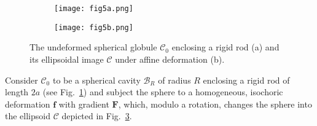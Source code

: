 \documentclass{article}
\begin{document}
\begin{figure}[h]
\centering
\begin{subfigure}[c]{0.3\linewidth}
		\centering
		\texttt{[image: fig5a.png]}
		\caption{}
		\label{fig:sphere}
	\end{subfigure}
\quad\quad 
\begin{subfigure}[c]{0.3\linewidth}
		\centering
		\texttt{[image: fig5b.png]}
		\caption{}
		\label{fig:ellipsoid}
	\end{subfigure}
\caption{The undeformed spherical globule $\mathcal{C}_0$ enclosing a rigid
rod (a) and its ellipsoidal image $\mathcal{C}$ under affine deformation
(b). }
\end{figure}

Consider $\mathcal{C}_0$ to be a spherical cavity $\mathscr{B}_R$ of radius $%
R$ enclosing a rigid rod of length $2a$ (see Fig.~\ref{fig:sphere}) and
subject the sphere to a homogeneous, isochoric deformation $\boldsymbol{f}$
with gradient $\mathbf{F}$, which, modulo a rotation, changes the sphere
into the ellipsoid $\mathcal{C}$ depicted in Fig.~\ref{fig:ellipsoid}.
\end{document}
